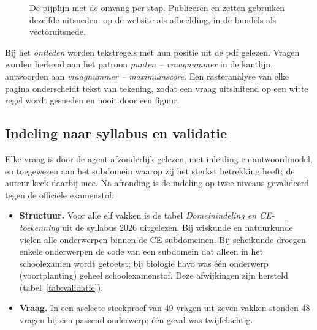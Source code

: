\documentclass[10.5pt,a4paper]{article}
\newcommand\zwart{\fontseries{k}\selectfont}
\begin{document}
\begin{figure}[!htb]
\centering
{}
\caption{De pijplijn met de omvang per stap. Publiceren en zetten gebruiken dezelfde uitsneden: op de website als afbeelding,
in de bundels als vectoruitsnede.}
\label{fig:pijplijn}
\end{figure}

Bij het \emph{ontleden} worden tekstregels met hun positie uit de pdf gelezen. Vragen worden herkend aan het patroon
\emph{punten -- vraagnummer} in de kantlijn, antwoorden aan \emph{vraagnummer -- maximumscore}. Een rasteranalyse van elke
pagina onderscheidt tekst van tekening, zodat een vraag uitsluitend op een witte regel wordt gesneden en nooit door een figuur.

\subsection{Indeling naar syllabus en validatie}
Elke vraag is door de agent afzonderlijk gelezen, met inleiding en antwoordmodel, en toegewezen aan het subdomein waarop
zij het sterkst betrekking heeft; de auteur keek daarbij mee. Na afronding is de indeling op twee niveaus gevalideerd
tegen de officiële examenstof:

\begin{itemize}
  \item \textbf{Structuur.} Voor alle elf vakken is de tabel \emph{Domeinindeling en CE-toekenning} uit de syllabus 2026
        uitgelezen. Bij wiskunde en natuurkunde vielen alle onderwerpen binnen de CE-subdomeinen. Bij scheikunde droegen
        enkele onderwerpen de code van een subdomein dat alleen in het schoolexamen wordt getoetst; bij biologie havo was
        één onderwerp (voortplanting) geheel schoolexamenstof. Deze afwijkingen zijn hersteld (tabel~\ref{tab:validatie}).
  \item \textbf{Vraag.} In een aselecte steekproef van 49 vragen uit zeven vakken stonden 48 vragen bij een passend
        onderwerp; één geval was twijfelachtig.
\end{itemize}
\end{document}
